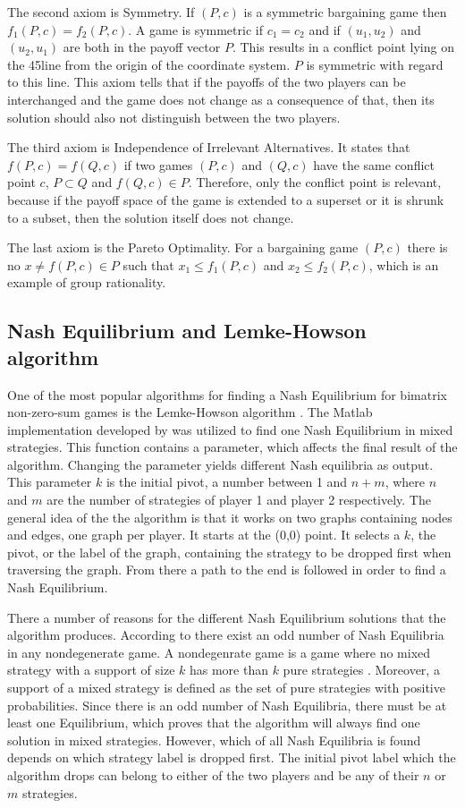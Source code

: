 The second axiom is Symmetry. If $(P,c)$ is a symmetric bargaining game then $f_1(P,c) = f_2(P,c)$. A game is symmetric if $c_1 = c_2$ and if $(u_1, u_2)$ and $(u_2, u_1)$ are both in the payoff vector $P$. This results in a conflict point lying on the 45\textdegree  line from the origin of the coordinate system. $P$ is symmetric with regard to this line. This axiom tells that if the payoffs of the two players can be interchanged and the game does not change as a consequence of that, then its solution should also not distinguish between the two players.

The third axiom is Independence of Irrelevant Alternatives. It states that $f(P,c) = f(Q,c)$ if two games $(P,c)$ and $(Q,c)$ have the same conflict point $c$, $P \subset Q$ and $f(Q,c) \in P$. Therefore, only the conflict point is relevant, because if the payoff space of the game is extended to a superset or it is shrunk to a subset, then the solution itself does not change.

The last axiom is the Pareto Optimality. For a bargaining game $(P,c)$ there is no $x \neq f(P,c) \in P$ such that $x_1 \leq f_1(P,c)$ and $x_2 \leq f_2(P,c)$, which is an example of group rationality.

\subsection{Nash Equilibrium and Lemke-Howson algorithm}
One of the most popular algorithms for finding a Nash Equilibrium for bimatrix non-zero-sum games is the Lemke-Howson algorithm \citep{lemke1964equilibrium}. The Matlab implementation developed by \citet{lemkeHowson2014Matlab} was utilized to find one Nash Equilibrium in mixed strategies. This function contains a parameter, which affects the final result of the algorithm. Changing the parameter yields different Nash equilibria as output. This parameter $k$ is the initial pivot, a number between 1 and $n+m$, where $n$ and $m$ are the number of strategies of player 1 and player 2 respectively. The general idea of the the algorithm is that it works on two graphs containing nodes and edges, one graph per player. It starts at the (0,0) point. It selects a $k$, the pivot, or the label of the graph, containing the strategy to be dropped first when traversing the graph. From there a path to the end is followed in order to find a Nash Equilibrium. 

There a number of reasons for the different Nash Equilibrium solutions that the algorithm produces. According to \citet{lemke1964equilibrium} there exist an odd number of Nash Equilibria in any nondegenerate game. A nondegenrate game is a game where no mixed strategy with a support of size $k$ has more than $k$ pure strategies \citep{nisan2007algorithmic}. Moreover, a support of a mixed strategy is defined as the set of pure strategies with positive probabilities. Since there is an odd number of Nash Equilibria, there must be at least one Equilibrium, which proves that the algorithm will always find one solution in mixed strategies. However, which of all Nash Equilibria is found depends on which strategy label is dropped first. The initial pivot label which the algorithm drops can belong to either of the two players and be any of their $n$ or $m$ strategies.

